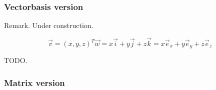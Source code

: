 \documentclass[a4paper]{article}
\begin{document}
\subsubsection{Vectorbasis version}

Remark. Under construction.

\begin{displaymath}
    \vec{v} = (x,y,z)^{T}
    \vec{w} = x\vec{i} + y\vec{j} + z\vec{k} = x\vec{e}_{x} + y\vec{e}_{y} + z\vec{e}_{z}
\end{displaymath}

TODO. 

\subsubsection{Matrix version}
\newtheorem{Theorem}{Theorem[The Fundamental Theorem of transforming 3-D Points into 2-D Points (with the Matrix version)]}
\end{document}

